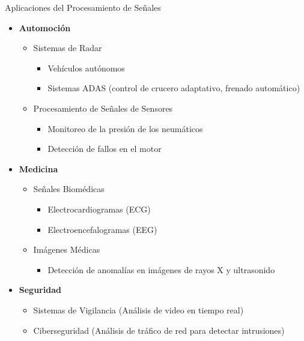 \begin{frame}{Aplicaciones del Procesamiento de Señales}
  \begin{itemize}
      \scriptsize
      \item \color{red}\textbf{Automoción}\color{black}
      \begin{itemize}
          \scriptsize
          \item Sistemas de Radar
          \begin{itemize}
              \scriptsize
              \item Vehículos autónomos
              \item Sistemas ADAS (control de crucero adaptativo, frenado automático)
          \end{itemize}
          \item Procesamiento de Señales de Sensores
          \begin{itemize}
              \scriptsize
              \item Monitoreo de la presión de los neumáticos
              \item Detección de fallos en el motor
          \end{itemize}
      \end{itemize}

      \item \color{red}\textbf{Medicina}\color{black}
      \begin{itemize}
          \scriptsize
          \item Señales Biomédicas
          \begin{itemize}
              \scriptsize
              \item Electrocardiogramas (ECG)
              \item Electroencefalogramas (EEG)
          \end{itemize}
          \item Imágenes Médicas
          \begin{itemize}
              \scriptsize
              \item Detección de anomalías en imágenes de rayos X y ultrasonido
          \end{itemize}
      \end{itemize}

      \item \color{red}\textbf{Seguridad}\color{black}
      \begin{itemize}
          \scriptsize
          \item Sistemas de Vigilancia (Análisis de video en tiempo real)
          \item Ciberseguridad (Análisis de tráfico de red para detectar intrusiones)
      \end{itemize}

  \end{itemize}
\end{frame}

